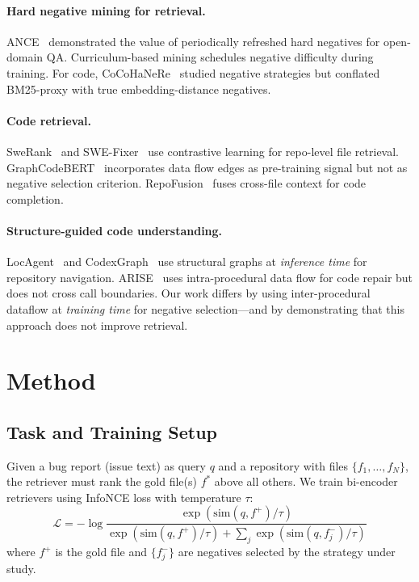 \documentclass[11pt,a4paper]{article}
\begin{document}
\paragraph{Hard negative mining for retrieval.}
ANCE~\cite{xiong2021ance} demonstrated the value of periodically refreshed hard negatives for open-domain QA.
Curriculum-based mining schedules negative difficulty during training.
For code, CoCoHaNeRe~\cite{gao2024cocohanere} studied negative strategies but conflated BM25-proxy with true embedding-distance negatives.

\paragraph{Code retrieval.}
SweRank~\cite{li2023swerank} and SWE-Fixer~\cite{yang2024swefixer} use contrastive learning for repo-level file retrieval.
GraphCodeBERT~\cite{guo2021graphcodebert} incorporates data flow edges as pre-training signal but not as negative selection criterion.
RepoFusion~\cite{shrivastava2023repofusion} fuses cross-file context for code completion.

\paragraph{Structure-guided code understanding.}
LocAgent~\cite{qin2024locagent} and CodexGraph~\cite{liu2024codexgraph} use structural graphs at \emph{inference time} for repository navigation.
ARISE~\cite{wu2024arise} uses intra-procedural data flow for code repair but does not cross call boundaries.
Our work differs by using inter-procedural dataflow at \emph{training time} for negative selection---and by demonstrating that this approach does not improve retrieval.


\section{Method}
\label{sec:method}

\subsection{Task and Training Setup}

Given a bug report (issue text) as query $q$ and a repository with files $\{f_1, \ldots, f_N\}$, the retriever must rank the gold file(s) $f^*$ above all others.
We train bi-encoder retrievers using InfoNCE loss with temperature $\tau$:
\begin{equation}
\mathcal{L} = -\log \frac{\exp(\text{sim}(q, f^+)/\tau)}{\exp(\text{sim}(q, f^+)/\tau) + \sum_{j} \exp(\text{sim}(q, f^-_j)/\tau)}
\end{equation}
where $f^+$ is the gold file and $\{f^-_j\}$ are negatives selected by the strategy under study.
\end{document}
